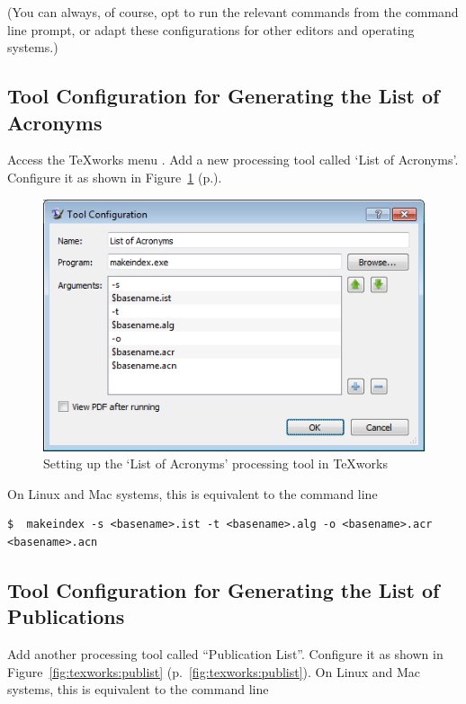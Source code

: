 \documentclass[a4paper,nofonts,raggedright,titlepage,openany]{tufte-book}
\begin{document}
(You can always, of course, opt to run the relevant commands from the command line prompt, or adapt these configurations for other editors and operating systems.)


\subsection{Tool Configuration for Generating the List of Acronyms}\label{sec:texworks:makeglossaries}
Access the TeXworks menu . Add a new processing tool called `List of Acronyms'. Configure it as shown in Figure~\ref{fig:texworks:acronyms} (p.\pageref{fig:texworks:acronyms}).

\begin{figure}
\centering
\includegraphics[width=.8\textwidth]{texworks-acronyms}
\caption{Setting up the `List of Acronyms' processing tool in TeXworks}
\label{fig:texworks:acronyms}
\end{figure}

On Linux and Mac systems, this is equivalent to the command line

\begin{fullwidth}
\begin{verbatim}
$  makeindex -s <basename>.ist -t <basename>.alg -o <basename>.acr <basename>.acn
\end{verbatim}
\end{fullwidth}



\subsection{Tool Configuration for Generating the List of Publications}
Add another processing tool called ``Publication List''. Configure it as shown in Figure~\ref{fig:texworks:publist} (p.~\ref{fig:texworks:publist}).
On Linux and Mac systems, this is equivalent to the command line
\end{document}

